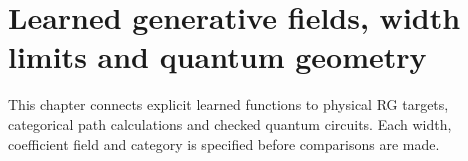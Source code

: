 \chapter{Learned generative fields, width limits and quantum geometry}
\label{book:learned-frontier}
This chapter connects explicit learned functions to physical RG targets, categorical path calculations and checked quantum circuits. Each width, coefficient field and category is specified before comparisons are made.








